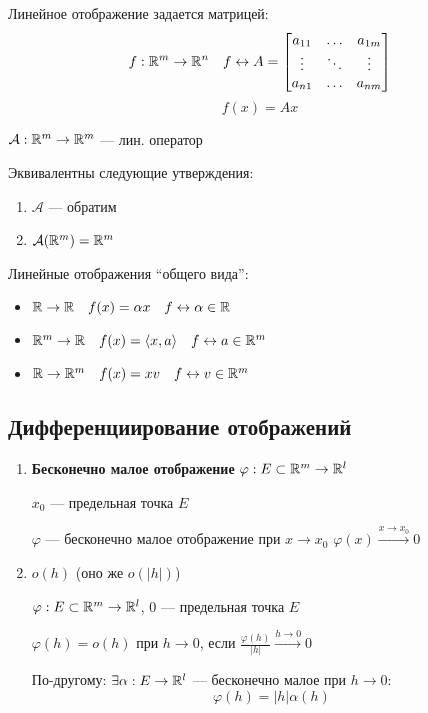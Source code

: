 Линейное отображение задается матрицей:
$$f:\mathbb{R}^m\to \mathbb{R}^n \quad f\leftrightarrow A = \begin{bmatrix}
    a_{11} & \ldots & a_{1m} \\
    \vdots & \ddots & \vdots \\
    a_{n1} & \ldots & a_{nm} 
\end{bmatrix}$$
$$f(x) = Ax$$

\begin{theorem}
    $\mathcal A:\mathbb{R}^m\to\mathbb{R}^m$ --- лин. оператор

    Эквивалентны следующие утверждения:
    \begin{enumerate}
        \item $\mathcal A$ --- обратим
        \item $\mathcal A(\mathbb{R}^m)=\mathbb{R}^m$
    \end{enumerate}
\end{theorem}

Линейные отображения ``общего вида'':
\begin{itemize}
    \item $\mathbb{R}\to\mathbb{R} \quad f(x)=\alpha x \quad f\leftrightarrow \alpha\in\mathbb{R}$
    \item $\mathbb{R}^m\to\mathbb{R} \quad f(x)=\langle x,a \rangle \quad f\leftrightarrow a\in\mathbb{R}^m$
    \item $\mathbb{R}\to\mathbb{R}^m \quad f(x)=xv \quad f\leftrightarrow v\in\mathbb{R}^m$
\end{itemize}

\subsection{Дифференциирование отображений}

\begin{definition}
    \begin{enumerate}
        \item \textbf{Бесконечно малое отображение} $\varphi : E\subset\mathbb{R}^m \to\mathbb{R}^l$

        $x_0$ --- предельная точка $E$
    
        $\varphi$ --- бесконечно малое отображение при $x\to x_0$ $\varphi(x)\xrightarrow{x\to x_0}0$

        \item $o(h)$ (оно же $o(|h|)$)
        
        $\varphi : E\subset \mathbb{R}^m \to \mathbb{R}^l$, $0$ --- предельная точка $E$

        $\varphi(h) = o(h)$ при $h\to0$, если $\frac{\varphi(h)}{|h|}\xrightarrow{h\to0}0$

        По-другому: $\exists \alpha : E\to\mathbb{R}^l$ --- бесконечно малое при $h\to0$:
        $$\varphi(h)=|h|\alpha(h)$$
    \end{enumerate}
\end{definition}

